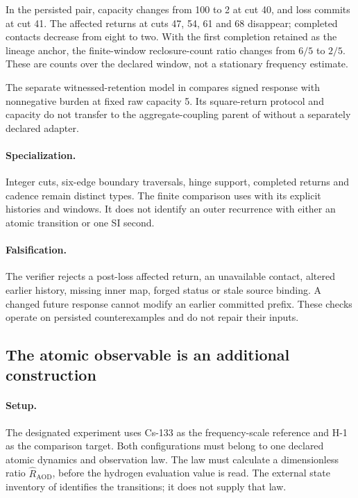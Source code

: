 In the persisted pair, capacity changes from 100 to 2 at cut 40, and loss commits at cut 41. The affected returns at cuts 47, 54, 61 and 68 disappear; completed contacts decrease from eight to two. With the first completion retained as the lineage anchor, the finite-window reclosure-count ratio changes from \(6/5\) to \(2/5\). These are counts over the declared window, not a stationary frequency estimate.

The separate witnessed-retention model in  compares signed
response with nonnegative burden at fixed raw capacity 5. Its square-return
protocol and capacity do not transfer to the aggregate-coupling parent of
 without a separately declared adapter.

\paragraph{Specialization.}
Integer cuts, six-edge boundary traversals, hinge support, completed returns and cadence remain distinct types. The finite comparison uses  with its explicit histories and windows. It does not identify an outer recurrence with either an atomic transition or one SI second.

\paragraph{Falsification.}
The verifier rejects a post-loss affected return, an unavailable contact, altered earlier history, missing inner map, forged status or stale source binding. A changed future response cannot modify an earlier committed prefix. These checks operate on persisted counterexamples and do not repair their inputs.


\subsection{The atomic observable is an additional construction}
\paragraph{Setup.}
The designated experiment uses Cs-133 as the frequency-scale reference and H-1 as the comparison target. Both configurations must belong to one declared atomic dynamics and observation law. The law must calculate a dimensionless ratio \(\widehat R_{\mathrm{AOD}}\), before the hydrogen evaluation value is read. The external state inventory of  identifies the transitions; it does not supply that law.

